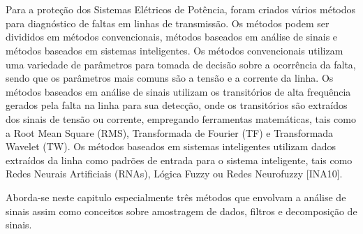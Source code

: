 \chapter{\captres}\label{analise}
\par 
Para a proteção dos Sistemas Elétricos de Potência, foram criados vários métodos para diagnóstico de faltas em linhas de transmissão.
Os métodos podem ser divididos em métodos convencionais, métodos baseados em análise de sinais e métodos baseados em sistemas inteligentes.
Os métodos convencionais utilizam uma variedade de parâmetros para tomada de decisão sobre a ocorrência da falta, sendo que os parâmetros mais comuns são a tensão e a corrente da linha.
Os métodos baseados em análise de sinais utilizam os transitórios de alta frequência gerados pela falta na linha para sua detecção, onde os transitórios são extraídos dos sinais de tensão ou corrente, empregando ferramentas matemáticas, tais como a Root Mean Square (RMS), Transformada de Fourier (TF) e Transformada Wavelet (TW).
Os métodos baseados em sistemas inteligentes utilizam dados extraídos da linha como padrões de entrada para o sistema inteligente, tais como Redes Neurais Artificiais (RNAs), Lógica Fuzzy ou Redes Neurofuzzy [INA10]. 
\par
Aborda-se neste capitulo especialmente três métodos que envolvam a análise de sinais assim como conceitos sobre amostragem de dados, filtros e decomposição de sinais.